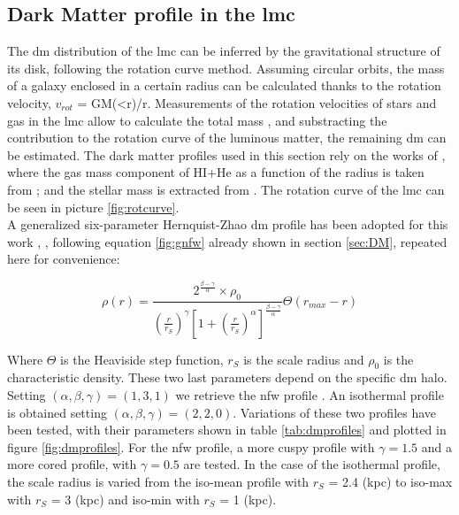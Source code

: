 \documentclass[main.tex]{subfiles}
\begin{document}
\subsection{Dark Matter profile in the \gls{lmc}}

The \gls{dm} distribution of the \gls{lmc} can be inferred by the gravitational structure of its disk, following the rotation curve method. Assuming circular orbits, the mass of a galaxy enclosed in a certain radius can be calculated thanks to the rotation velocity, $v_{rot}$ = GM(<r)/r. Measurements of the rotation velocities of stars and gas in the \gls{lmc} allow to calculate the total mass \cite{LMCHI}, and substracting the contribution to the rotation curve of the luminous matter, the remaining \gls{dm} can be estimated. The dark matter profiles used in this section rely on the works of \cite{2015FermiLMCDM}, where the gas mass component of HI+He as a function of the radius is taken from \cite{1992gasLMC}; and the stellar mass is extracted from \cite{2006LMCkinematics}. The rotation curve of the \gls{lmc} can be seen in picture \ref{fig:rotcurve}.\\
A generalized six-parameter Hernquist-Zhao \gls{dm} profile has been adopted for this work \cite{1990Hernquist}, \cite{1996Zhao}, following equation \ref{fig:gnfw} already shown in section \ref{sec:DM}, repeated here for convenience:


\begin{equation}
    \rho(r) = \frac{2^{\frac{\beta-\gamma}{\alpha}} \times \rho_{0}}{\left(\frac{r}{r_{S}}\right)^{\gamma}\left[ 1+\left(\frac{r}{r_{S}} \right)^{\alpha}\right]^{\frac{\beta-\gamma}{\alpha}}}\Theta(r_{max}-r)
\end{equation} \label{fig:gnfw}

Where $\Theta$ is the Heaviside step function, $r_{S}$ is the scale radius and $\rho_{0}$ is the characteristic density. These two last parameters depend on the specific \gls{dm} halo. Setting $(\alpha,\beta,\gamma) = (1,3,1)$ we retrieve the \gls{nfw} profile \cite{NFW}. An isothermal profile is obtained setting $(\alpha,\beta,\gamma) = (2,2,0)$. Variations of these two profiles have been tested, with their parameters shown in table \ref{tab:dmprofiles} and plotted in figure \ref{fig:dmprofiles}. For the \gls{nfw} profile, a more cuspy profile with $\gamma=1.5$ and a more cored profile, with $\gamma=0.5$ are tested. In the case of the isothermal profile, the scale radius is varied from the iso-mean profile with $r_{S}$ = 2.4 (kpc) to iso-max with $r_{S}$ = 3 (kpc) and iso-min with $r_{S}$ = 1 (kpc).
\end{document}
